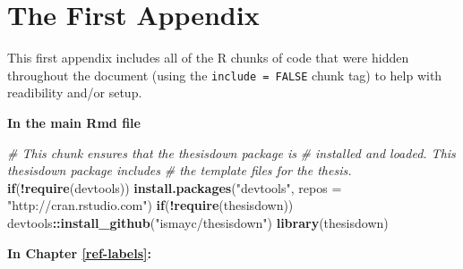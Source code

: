 \documentclass[12pt,twoside]{reedthesis}
\newenvironment{Shaded}{\begin{snugshade}}{\end{snugshade}}
\newcommand{\CommentTok}[1]{\textcolor[rgb]{0.56,0.35,0.01}{\textit{#1}}}
\newcommand{\ControlFlowTok}[1]{\textcolor[rgb]{0.13,0.29,0.53}{\textbf{#1}}}
\newcommand{\DataTypeTok}[1]{\textcolor[rgb]{0.13,0.29,0.53}{#1}}
\newcommand{\KeywordTok}[1]{\textcolor[rgb]{0.13,0.29,0.53}{\textbf{#1}}}
\newcommand{\NormalTok}[1]{#1}
\newcommand{\OperatorTok}[1]{\textcolor[rgb]{0.81,0.36,0.00}{\textbf{#1}}}
\newcommand{\StringTok}[1]{\textcolor[rgb]{0.31,0.60,0.02}{#1}}
\begin{document}
\appendix

\hypertarget{the-first-appendix}{%
\chapter{The First Appendix}\label{the-first-appendix}}

This first appendix includes all of the R chunks of code that were hidden throughout the document (using the \texttt{include\ =\ FALSE} chunk tag) to help with readibility and/or setup.

\textbf{In the main Rmd file}
\begin{Shaded}
\begin{Highlighting}[]
\CommentTok{# This chunk ensures that the thesisdown package is}
\CommentTok{# installed and loaded. This thesisdown package includes}
\CommentTok{# the template files for the thesis.}
\ControlFlowTok{if}\NormalTok{(}\OperatorTok{!}\KeywordTok{require}\NormalTok{(devtools))}
  \KeywordTok{install.packages}\NormalTok{(}\StringTok{"devtools"}\NormalTok{, }\DataTypeTok{repos =} \StringTok{"http://cran.rstudio.com"}\NormalTok{)}
\ControlFlowTok{if}\NormalTok{(}\OperatorTok{!}\KeywordTok{require}\NormalTok{(thesisdown))}
\NormalTok{  devtools}\OperatorTok{::}\KeywordTok{install_github}\NormalTok{(}\StringTok{"ismayc/thesisdown"}\NormalTok{)}
\KeywordTok{library}\NormalTok{(thesisdown)}
\end{Highlighting}
\end{Shaded}
\textbf{In Chapter \ref{ref-labels}:}
\end{document}
